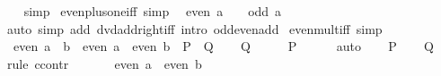 \begin{isabellebody}
\ \ %
\endisadelimproof
%
\isatagproof
{}\isamarkupfalse%
\ simp%
\endisatagproof
{\isafoldproof}%
%
\isadelimproof
\isanewline
%
\endisadelimproof
\isanewline
{}\isamarkupfalse%
\ even{\isacharunderscore}{\kern0pt}plus{\isacharunderscore}{\kern0pt}one{\isacharunderscore}{\kern0pt}iff\ {\isacharbrackleft}{\kern0pt}simp{\isacharbrackright}{\kern0pt}{\isacharcolon}{\kern0pt}\isanewline
\ \ {\isachardoublequoteopen}even\ {\isacharparenleft}{\kern0pt}a\ {\isacharplus}{\kern0pt}\ {}{\isacharparenright}{\kern0pt}\ {\isasymlongleftrightarrow}\ odd\ a{\isachardoublequoteclose}\isanewline
%
\isadelimproof
\ \ %
\endisadelimproof
%
\isatagproof
{}\isamarkupfalse%
\ {\isacharparenleft}{\kern0pt}auto\ simp\ add{\isacharcolon}{\kern0pt}\ dvd{\isacharunderscore}{\kern0pt}add{\isacharunderscore}{\kern0pt}right{\isacharunderscore}{\kern0pt}iff\ intro{\isacharcolon}{\kern0pt}\ odd{\isacharunderscore}{\kern0pt}even{\isacharunderscore}{\kern0pt}add{\isacharparenright}{\kern0pt}%
\endisatagproof
{\isafoldproof}%
%
\isadelimproof
\isanewline
%
\endisadelimproof
\isanewline
{}\isamarkupfalse%
\ even{\isacharunderscore}{\kern0pt}mult{\isacharunderscore}{\kern0pt}iff\ {\isacharbrackleft}{\kern0pt}simp{\isacharbrackright}{\kern0pt}{\isacharcolon}{\kern0pt}\isanewline
\ \ {\isachardoublequoteopen}even\ {\isacharparenleft}{\kern0pt}a\ {\isacharasterisk}{\kern0pt}\ b{\isacharparenright}{\kern0pt}\ {\isasymlongleftrightarrow}\ even\ a\ {\isasymor}\ even\ b{\isachardoublequoteclose}\ {\isacharparenleft}{\kern0pt}\ {\isachardoublequoteopen}{\isacharquery}{\kern0pt}P\ {\isasymlongleftrightarrow}\ {\isacharquery}{\kern0pt}Q{\isachardoublequoteclose}{\isacharparenright}{\kern0pt}\isanewline
%
\isadelimproof
%
\endisadelimproof
%
\isatagproof
{}\isamarkupfalse%
\isanewline
\ \ \isamarkupfalse%
\ {\isacharquery}{\kern0pt}Q\isanewline
\ \ \isamarkupfalse%
\ \isamarkupfalse%
\ {\isacharquery}{\kern0pt}P\isanewline
\ \ \ \ \isamarkupfalse%
\ auto\isanewline
{}\isamarkupfalse%
\isanewline
\ \ \isamarkupfalse%
\ {\isacharquery}{\kern0pt}P\isanewline
\ \ \isamarkupfalse%
\ {\isacharquery}{\kern0pt}Q\isanewline
\ \ \isamarkupfalse%
\ {\isacharparenleft}{\kern0pt}rule\ ccontr{\isacharparenright}{\kern0pt}\isanewline
\ \ \ \ \isamarkupfalse%
\ {\isachardoublequoteopen}{\isasymnot}\ {\isacharparenleft}{\kern0pt}even\ a\ {\isasymor}\ even\ b{\isacharparenright}{\kern0pt}{\isachardoublequoteclose}\isanewline

\end{isabellebody}
